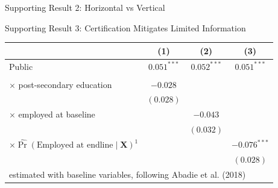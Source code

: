 \begin{frame}{Supporting Result 2: Horizontal vs Vertical}
\end{frame}

\begin{frame}{Supporting Result 3: Certification Mitigates Limited Information}
    \begin{center}
        \small
        \begin{tabular}{lccc}
        & (1) & (2) & (3) \\ \hline
       Public & ${0.051^{***}}$ & ${0.052^{***}}$ & ${0.051^{***}}$\\
        &\\
       $\times$ post-secondary education & $-0.028$ \\
       & $(0.028)$\\
       $\times$ employed at baseline & & $-0.043$ \\
       & & $(0.032)$ \\
       $\times \hat{\Pr}\left(\text{Employed at endline}\mid \mathbf{X}\right)^1$  & & & $-0.076^{***}$ \\ %
       && & $(0.028)$\\ \hline
       \multicolumn{4}{l}{\footnotesize estimated with baseline variables, following Abadie et al. (2018)}
        \end{tabular}
    \end{center}
\end{frame}